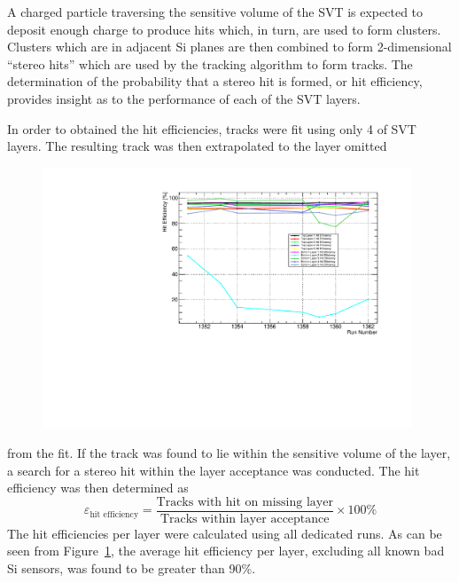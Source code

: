 
%
%
 
A charged particle traversing the sensitive volume of the SVT is expected to
deposit enough charge to produce hits which, in turn, are used to form 
clusters. Clusters which are in adjacent Si planes are then combined to form
2-dimensional ``stereo hits'' which are used by the tracking algorithm to 
form tracks.  The determination of the probability that a stereo hit is 
formed, or hit efficiency, provides insight as to the performance of each of 
the SVT layers.

In order to obtained the hit efficiencies, tracks were fit using only 4 of 
SVT layers. The resulting track was then extrapolated to the layer omitted
\begin{figure}[h]
    \begin{center}
    	\includegraphics[width=0.98\textwidth]{test2012/svtperformance/trk_performance/hit_efficiency_vs_rn.pdf}
        \caption{} 
	\label{fig:hit_efficiency}
    \end{center}
\end{figure}
from the fit. If the track was found to lie within the sensitive volume
of the layer, a search for a stereo hit within the layer acceptance was 
conducted.  The hit efficiency was then determined as
\[
    \varepsilon_{\mbox{hit efficiency}} = \frac{\mbox{Tracks with hit on missing layer}}
                                            {\mbox{Tracks within layer acceptance}} \times 100 \%
\]
The hit efficiencies per layer were calculated using all dedicated runs. As 
can be seen from Figure~\ref{fig:hit_efficiency}, the average hit efficiency
per layer, excluding all known bad Si sensors, was found to be greater than
90\%.

